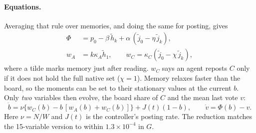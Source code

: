 \documentclass[10pt,a4paper]{article}
\begin{document}
\paragraph{Equations.} Averaging that rule over memories, and doing the same for posting, gives
\begin{align}
\Phi&=p_0-\beta\,\widetilde h_k+\alpha\,(\widetilde j_0-\eta\,\widetilde j_k),\label{eq:gptphi}\\
w_A&=k\kappa_A\widetilde h_1,\qquad w_C=\kappa_C(\widetilde j_0-\chi\,\widetilde j_k),\label{eq:gptpost}
\end{align}
where a tilde marks memory just after reading. $w_C$ says an agent reposts $C$ only if it does not hold the full native
set ($\chi=1$). Memory relaxes faster than the board, so the moments can be set to their stationary values at the
current $b$. Only \emph{two} variables then evolve, the board share of $C$ and the mean last vote $v$:
\begin{equation}
\dot b=\nu\{w_C(b)-b\,[w_A(b)+w_C(b)]\}+J(t)(1-b),\qquad \dot v=\Phi(b)-v.\label{eq:gpt2}
\end{equation}
Here $\nu=N/W$ and $J(t)$ is the controller's posting rate. The reduction matches the 15-variable version to within
$1.3\times10^{-4}$ in $G$.
\end{document}
